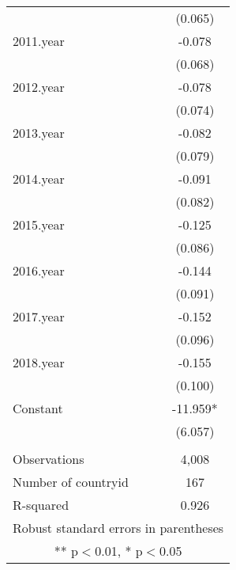 \begin{tabular}{lc}
 & (0.065) \\
2011.year & -0.078 \\
 & (0.068) \\
2012.year & -0.078 \\
 & (0.074) \\
2013.year & -0.082 \\
 & (0.079) \\
2014.year & -0.091 \\
 & (0.082) \\
2015.year & -0.125 \\
 & (0.086) \\
2016.year & -0.144 \\
 & (0.091) \\
2017.year & -0.152 \\
 & (0.096) \\
2018.year & -0.155 \\
 & (0.100) \\
Constant & -11.959* \\
 & (6.057) \\
 &  \\
Observations & 4,008 \\
Number of countryid & 167 \\
 R-squared & 0.926 \\ \hline
\multicolumn{2}{c}{ Robust standard errors in parentheses} \\
\multicolumn{2}{c}{ ** p$<$0.01, * p$<$0.05} \\
\end{tabular}
